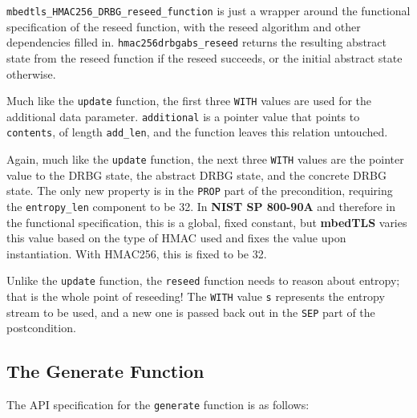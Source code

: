 \documentclass[pageno]{jpaper}
\newcommand{\stdtitle}[1]{\textbf{#1}}
\begin{document}
\lstinline{mbedtls_HMAC256_DRBG_reseed_function} is just a wrapper around the functional specification of the reseed function, with the reseed algorithm and other dependencies filled in. \lstinline{hmac256drbgabs_reseed} returns the resulting abstract state from the reseed function if the reseed succeeds, or the initial abstract state otherwise.

Much like the \lstinline{update} function, the first three \lstinline{WITH} values are used for the additional data parameter. \lstinline{additional} is a pointer value that points to \lstinline{contents}, of length \lstinline{add_len}, and the function leaves this relation untouched.

Again, much like the \lstinline{update} function, the next three \lstinline{WITH} values are the pointer value to the DRBG state, the abstract DRBG state, and the concrete DRBG state. The only new property is in the \lstinline{PROP} part of the precondition, requiring the \lstinline{entropy_len} component to be 32. In \stdtitle{NIST SP 800-90A} and therefore in the functional specification, this is a global, fixed constant, but \stdtitle{mbedTLS} varies this value based on the type of HMAC used and fixes the value upon instantiation. With HMAC256, this is fixed to be 32.

Unlike the \lstinline{update} function, the \lstinline{reseed} function needs to reason about entropy; that is the whole point of reseeding! The \lstinline{WITH} value \lstinline{s} represents the entropy stream to be used, and a new one is passed back out in the \lstinline{SEP} part of the postcondition.

\subsection{The Generate Function}

The API specification for the \lstinline{generate} function is as follows:
\end{document}
